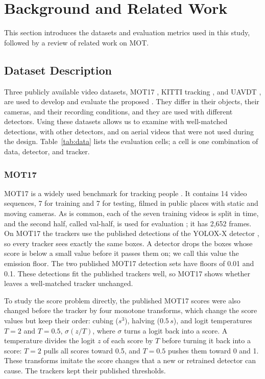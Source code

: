 \section{Background and Related Work}\label{sec:related}
This section introduces the datasets and evaluation metrics used in this study, followed by a
review of related work on MOT.

\subsection{Dataset Description}\label{sec:data}
Three publicly available video datasets, MOT17 \cite{milan2016mot16}, KITTI tracking
\cite{geiger2012kitti}, and UAVDT \cite{du2018uavdt}, are used to develop and evaluate the
proposed \scl{}. They differ in their objects, their cameras, and their recording conditions, and
they are used with different detectors. Using these datasets allows us to examine \scl{} with
well-matched detections, with other detectors, and on aerial videos that were not used during the
design. Table~\ref{tab:data} lists the evaluation cells; a cell is one combination of data,
detector, and tracker.

\subsubsection{MOT17}
MOT17 is a widely used benchmark for tracking people \cite{milan2016mot16}. It contains 14 video
sequences, 7 for training and 7 for testing, filmed in public places with static and moving
cameras. As is common, each of the seven training videos is split in time, and the second half,
called val-half, is used for evaluation \cite{zhang2022bytetrack}; it has 2,652 frames. On MOT17
the trackers use the published detections of the YOLOX-X detector \cite{ge2021yolox}, so every
tracker sees exactly the same boxes. A detector drops the boxes whose score is below a small value
before it passes them on; we call this value the emission floor. The two published MOT17 detection
sets have floors of 0.01 and 0.1. These detections fit the published trackers well, so MOT17 shows
whether \scl{} leaves a well-matched tracker unchanged.

To study the score problem directly, the published MOT17 scores were also changed before the
tracker by four monotone transforms, which change the score values but keep their order: cubing
($s^3$), halving ($0.5\,s$), and logit temperatures $T=2$ and $T=0.5$, $\sigma(z/T)$, where
$\sigma$ turns a logit back into a score. A temperature divides the logit $z$ of each score by $T$
before turning it back into a score: $T=2$ pulls all scores toward 0.5, and $T=0.5$ pushes them
toward 0 and 1. These transforms imitate the score changes that a new or retrained detector can
cause. The trackers kept their published thresholds.

